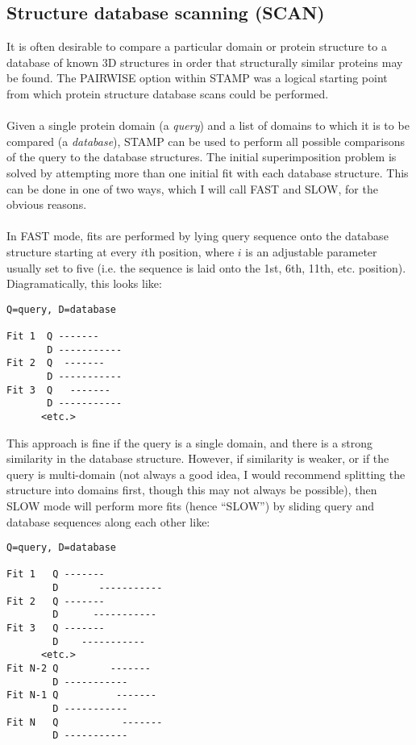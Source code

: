 \subsection{Structure database scanning (SCAN)}

It is often desirable to compare a particular domain or protein 
structure to a database of known 3D structures in order that structurally similar 
proteins may be found.  The PAIRWISE option within STAMP was a
logical starting point from which protein structure database scans
could be performed.\\
\\
Given a single protein domain (a {\em query}) and a list of domains to which it is
to be compared (a {\em database}), STAMP can be used to perform all possible
comparisons of the query to the database structures.  The initial
superimposition problem is solved by attempting more than one
initial fit with each database structure.    This can be done in one of two ways,
which I will call FAST and SLOW, for the obvious reasons.\\
\\
In FAST mode, fits are performed by lying
query sequence onto the database structure starting at every $i$th position,
where $i$ is an adjustable parameter usually set to five (i.e. the sequence
is laid onto the 1st, 6th, 11th, etc. position).   Diagramatically, this looks
like:\\

\begin{verbatim}
Q=query, D=database

Fit 1  Q -------
       D -----------
Fit 2  Q  -------
       D -----------
Fit 3  Q   -------
       D -----------
      <etc.>
\end{verbatim}

This approach is fine if the query is a single domain, and there is a strong similarity in
the database structure.  However, if similarity is weaker, or if the query is multi-domain (not
always a good idea, I would recommend splitting the structure into domains first, though this
may not always be possible), then SLOW mode will perform more fits (hence ``SLOW'') by sliding
query and database sequences along each other like:\\

\begin{verbatim}
Q=query, D=database

Fit 1   Q -------
        D       -----------
Fit 2   Q -------
        D      -----------
Fit 3   Q -------
        D    -----------
      <etc.>
Fit N-2 Q         -------
        D -----------
Fit N-1 Q          -------
        D -----------
Fit N   Q           -------
        D -----------
\end{verbatim}

